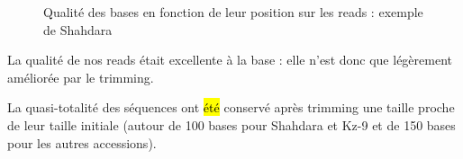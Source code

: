 \documentclass[a4paper]{article}
\newcommand{\add}[1]{\todo[color=cyan!40]{#1}}
\newcommand{\hladd}[1]{\sethlcolor{cyan} \hl{#1} \add{#1}}
\begin{document}
\begin{figure}[!ht]
\centering

 

\label{quality}
\caption{Qualité des bases en fonction de leur position sur les reads : exemple de Shahdara}
\end{figure}

La qualité de nos reads était excellente à la base : elle n'est donc que légèrement améliorée par le trimming. 

La quasi-totalité des séquences ont \hladd{été} conservé après trimming une taille proche de leur taille initiale  (autour de 100 bases pour Shahdara et Kz-9 et de 150 bases pour les autres accessions). 
\end{document}
